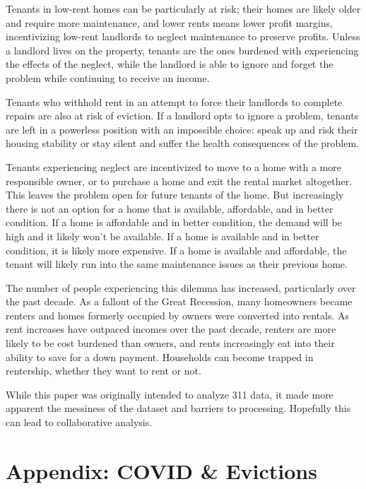 \documentclass[
  openany]{book}
\begin{document}
Tenants in low-rent homes can be particularly at risk; their homes are likely older and require more maintenance, and lower rents means lower profit margins, incentivizing low-rent landlords to neglect maintenance to preserve profits. Unless a landlord lives on the property, tenants are the ones burdened with experiencing the effects of the neglect, while the landlord is able to ignore and forget the problem while continuing to receive an income.

Tenants who withhold rent in an attempt to force their landlords to complete repairs are also at risk of eviction. If a landlord opts to ignore a problem, tenants are left in a powerless position with an impossible choice: speak up and risk their housing stability or stay silent and suffer the health consequences of the problem.

Tenants experiencing neglect are incentivized to move to a home with a more responsible owner, or to purchase a home and exit the rental market altogether. This leaves the problem open for future tenants of the home. But increasingly there is not an option for a home that is available, affordable, and in better condition. If a home is affordable and in better condition, the demand will be high and it likely won't be available. If a home is available and in better condition, it is likely more expensive. If a home is available and affordable, the tenant will likely run into the same maintenance issues as their previous home.

The number of people experiencing this dilemma has increased, particularly over the past decade. As a fallout of the Great Recession, many homeowners became renters and homes formerly occupied by owners were converted into rentals. As rent increases have outpaced incomes over the past decade, renters are more likely to be cost burdened than owners, and rents increasingly eat into their ability to save for a down payment. Households can become trapped in rentership, whether they want to rent or not.

While this paper was originally intended to analyze 311 data, it made more apparent the messiness of the dataset and barriers to processing. Hopefully this can lead to collaborative analysis.

\hypertarget{appendix-covid-evictions}{%
\chapter{Appendix: COVID \& Evictions}\label{appendix-covid-evictions}}
\end{document}
